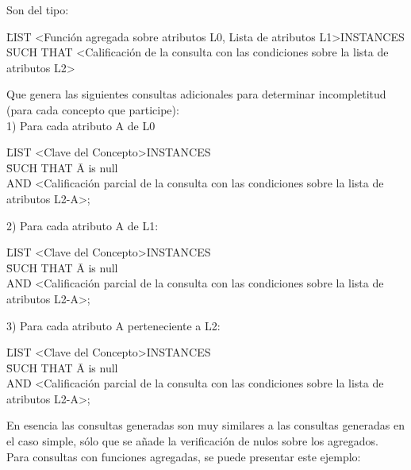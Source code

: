 Son del tipo: \\

\begin{tabbing}	
\= LIST  \textless Función agregada sobre atributos L0, Lista de atributos L1\textgreater INSTANCES \\
SUCH THAT \textless Calificación de la consulta con las condiciones sobre la lista de atributos L2\textgreater
\end{tabbing}

	Que genera las siguientes consultas adicionales para determinar incompletitud (para cada concepto que participe): \\

1) Para cada atributo A de L0 

\begin{tabbing}	
\= LIST \textless Clave del Concepto\textgreater INSTANCES \\
\= SUCH THAT \= A is null \\
\> \> AND \textless Calificación parcial de la consulta con las condiciones sobre la lista de atributos L2-A\textgreater; 
\end{tabbing}

2) Para cada atributo A de L1:

\begin{tabbing}	
\= LIST \textless Clave del Concepto\textgreater INSTANCES \\
\= SUCH THAT \= A is null \\
\> \> AND \textless Calificación parcial de la consulta con las condiciones sobre la lista de atributos L2-A\textgreater; 
\end{tabbing}

3)  Para cada atributo A perteneciente a L2: 

\begin{tabbing}	
\= LIST \textless Clave del Concepto\textgreater INSTANCES \\
\= SUCH THAT \= A is null \\
\> \> AND \textless Calificación parcial de la consulta con las condiciones sobre la lista de atributos L2-A\textgreater;
\end{tabbing}

	En esencia las consultas generadas son muy similares a las consultas generadas en el caso simple, sólo que se añade la  verificación de nulos sobre los agregados. \\

	Para consultas con funciones agregadas, se puede presentar este ejemplo: 
	
